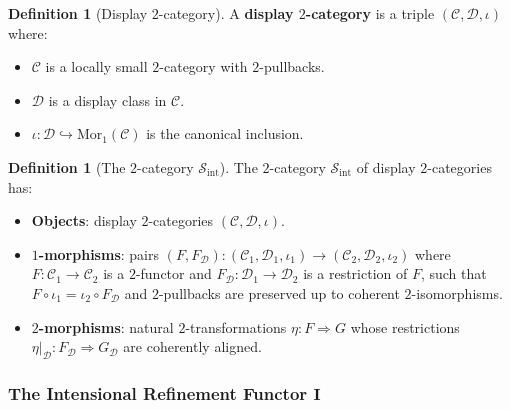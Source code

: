 \documentclass[11pt]{article}
\theoremstyle{plain}
\theoremstyle{definition}
\newtheorem{definition}[theorem]{Definition}
\newcommand{\cS}{\mathcal{S}}
\newcommand{\cC}{\mathcal{C}}
\newcommand{\cD}{\mathcal{D}}
\newcommand{\Sint}{\cS_{\mathrm{int}}}
\newcommand{\Mor}{\mathrm{Mor}}
\newcommand{\II}{\mathbf{I}}
\begin{document}
\begin{definition}[Display $2$-category]\label{def:display-2-cat}
A \textbf{display $2$-category} is a triple $(\cC, \cD, \iota)$ where:
\begin{itemize}
\item $\cC$ is a locally small $2$-category with $2$-pullbacks.
\item $\cD$ is a display class in $\cC$.
\item $\iota : \cD \hookrightarrow \Mor_1(\cC)$ is the canonical inclusion.
\end{itemize}
\end{definition}

\begin{definition}[The $2$-category $\Sint$]\label{def:Sint}
The $2$-category $\Sint$ of display $2$-categories has:
\begin{itemize}
\item \textbf{Objects}: display $2$-categories $(\cC, \cD, \iota)$.
\item \textbf{$1$-morphisms}: pairs $(F, F_\cD) : (\cC_1, \cD_1, \iota_1) \to (\cC_2, \cD_2, \iota_2)$ where $F : \cC_1 \to \cC_2$ is a $2$-functor and $F_\cD : \cD_1 \to \cD_2$ is a restriction of $F$, such that $F \circ \iota_1 = \iota_2 \circ F_\cD$ and $2$-pullbacks are preserved up to coherent $2$-isomorphisms.
\item \textbf{$2$-morphisms}: natural $2$-transformations $\eta : F \Rightarrow G$ whose restrictions $\eta|_\cD : F_\cD \Rightarrow G_\cD$ are coherently aligned.
\end{itemize}
\end{definition}

\subsubsection{\texorpdfstring{The Intensional Refinement Functor $\II$}{The Intensional Refinement Functor I}}
\end{document}
